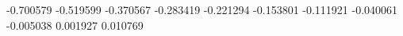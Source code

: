 -0.700579
-0.519599
-0.370567
-0.283419
-0.221294
-0.153801
-0.111921
-0.040061
-0.005038
0.001927
0.010769
